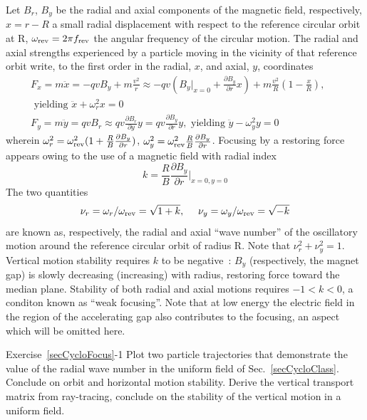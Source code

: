 Let $B_r$, $B_y$  be the radial and axial components of the magnetic field, respectively, 
$x=r-R$ a small radial displacement with respect to the reference circular orbit at R,  
$\omega_{\rm rev} = 2\pi f_{\rm rev} $ the angular frequency of the circular motion. 
The radial and axial  strengths experienced by a particle moving in the vicinity of that reference orbit 
write, to the first order in the radial, $x$,  and axial, $y$, coordinates 
\begin{eqnarray}
\label{EqCycloFoc}
F_x = m \ddot x=  -qvB_y + m\frac{v^2}{r} \approx -q v (B_y|_{x=0} + \frac{\partial B_y}{\partial r}x)  + m\frac{v^2}{R}(1-\frac{x}{R}), & \nonumber \\ 
\textrm{~yielding~}  \ddot x + \omega_r^2 x=0 &  \nonumber \\
F_y= m\ddot y =   qvB_r \approx q v \frac{\partial B_r}{\partial y} y = q v \frac{\partial B_y}{\partial r} y, 
 \textrm{~yielding~}    \ddot{y} - \omega_y^2 y= 0  & ~ ~ ~ 
\end{eqnarray}
wherein 
$\omega_r^2 = \omega_{\rm rev}^2(1+\frac{R}{B}\frac{\partial B_y}{\partial r})$,  
$ \omega_y^2 = \omega_{\rm rev}^2 \frac{R}{B} \frac{\partial B_y}{\partial r}$. 
Focusing by a restoring force appears owing to the use of a magnetic field with radial 
index 
\begin{equation}
\label{EqCycloRadialIndex}
k = \frac{R}{B}\frac{\partial B_y}{\partial r}|_{x=0,y=0} 
\end{equation}
The two quantities 
\begin{equation}
  \nu_r = \omega_r/\omega_{\rm rev} = \sqrt{1+k},   ~ ~ ~ ~ 
 \nu_y=\omega_y /\omega_{\rm rev}  = \sqrt{-k} 
\end{equation}
are known  as, respectively, the radial and axial ``wave number'' of 
the oscillatory motion around the reference circular orbit of radius R.
Note that $\nu_r^2 + \nu_y^2=1$.
Vertical motion stability requires $k$ to be negative~:  $B_y$ (respectively, the magnet gap) 
is slowly  decreasing (increasing) with radius, restoring force toward the 
median plane. 
Stability of both radial and axial motions requires $-1 < k <0$, a conditon known as ``weak focusing''.
 Note that  at low energy  the electric field in the 
region of the accelerating gap also contributes to the focusing, an aspect which will be omitted here. 


\smallskip
\noindent {\small $\bullet$} Exercise~\ref{secCycloFocus}-1
Plot two particle trajectories that demonstrate the value of the radial wave number in the uniform 
field of Sec.~\ref{secCycloClass}. Conclude on orbit and horizontal motion  stability. 
Derive the  vertical  transport matrix from ray-tracing, conclude on the stability of the vertical motion
in a uniform field.

